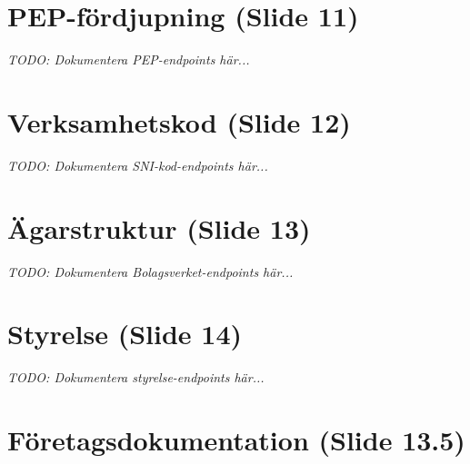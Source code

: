 \documentclass[12pt,a4paper]{article}
\begin{document}
\section{PEP-fördjupning (Slide 11)}

\textit{TODO: Dokumentera PEP-endpoints här...}

\newpage


\section{Verksamhetskod (Slide 12)}

\textit{TODO: Dokumentera SNI-kod-endpoints här...}

\newpage


\section{Ägarstruktur (Slide 13)}

\textit{TODO: Dokumentera Bolagsverket-endpoints här...}

\newpage


\section{Styrelse (Slide 14)}

\textit{TODO: Dokumentera styrelse-endpoints här...}

\newpage


\section{Företagsdokumentation (Slide 13.5)}
\end{document}
